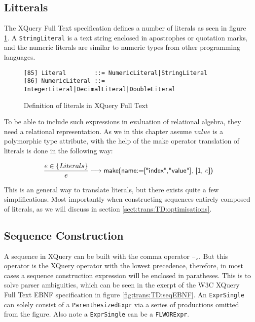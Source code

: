 \subsection{Litterals}
\label{sect:trans:TD:litteral}

The XQuery Full Text specification\cite{w3c01} defines a number of literals as seen in figure
\ref{fig:trans:TD:litEBNF}. A \texttt{StringLiteral} is a text string enclosed in apostrophes or quotation marks,
and the numeric literals are similar to numeric types from other programming languages. 

\begin{figure}[h]
\begin{Verbatim}
[85] Literal        ::= NumericLiteral|StringLiteral
[86] NumericLiteral ::= IntegerLiteral|DecimalLiteral|DoubleLiteral
\end{Verbatim}
\caption[Literals in XQuery]{Definition of literals in XQuery Full Text}
\label{fig:trans:TD:litEBNF}
\end{figure}

To be able to include such expressions in evaluation of relational algebra, they need a relational representation.
As we in this chapter assume $value$ is a polymorphic type attribute, with the help of the \textsf{make} operator
translation of literals is done in the following way:

\begin{equation}
\frac{e \in \left\{Literals\right\}}{e}\longmapsto
\mbox{\textsf{make(name:=["index","value"], [1, }}e\mbox{\textsf{])}}
\label{rule:trans:TD:literal}
\end{equation}

This is an general way to translate literals, but there exists quite a few simplifications. Most importantly when
constructing sequences entirely composed of literals, as we will discuss in section
\ref{sect:trans:TD:optimisations}.

\subsection{Sequence Construction}
\label{sect:trans:TD:seqBuild}

A sequence in XQuery can be built with the comma operator --\texttt{,}. But this operator is the XQuery operator
with the lowest precedence, therefore, in most cases a sequence construction expression will be enclosed in
paratheses. This is to solve parser ambiguities, which can be seen in the exerpt of the W3C XQuery Full Text EBNF
specification\cite{w3c01} in figure \ref{fig:trans:TD:seqEBNF}. An \texttt{ExprSingle} can solely consist of a
\texttt{ParenthesizedExpr} via a series of productions omitted from the figure. Also note a \texttt{ExprSingle}
can be a \texttt{FLWORExpr}.

